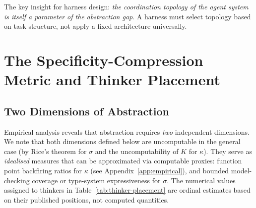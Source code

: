 \documentclass[11pt, a4paper, copyright]{googledeepmind}
\begin{document}
The key insight for harness design: \emph{the coordination topology of the agent system is itself a parameter of the abstraction gap}. A harness must select topology based on task structure, not apply a fixed architecture universally.


\section{The Specificity-Compression Metric and Thinker Placement}
\label{sec:thinker-placement}

\subsection{Two Dimensions of Abstraction}

Empirical analysis reveals that abstraction requires \emph{two} independent dimensions. We note that both dimensions defined below are uncomputable in the general case (by Rice's theorem for $\sigma$ and the uncomputability of $K$ for $\kappa$). They serve as \emph{idealised} measures that can be approximated via computable proxies: function point backfiring ratios for $\kappa$ (see Appendix~\ref{app:empirical}), and bounded model-checking coverage or type-system expressiveness for $\sigma$. The numerical values assigned to thinkers in Table~\ref{tab:thinker-placement} are ordinal estimates based on their published positions, not computed quantities.
\end{document}
